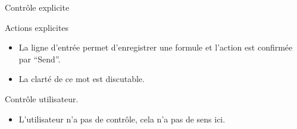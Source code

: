 \begin{frame}{Contrôle explicite}

  \begin{block}{Actions explicites}
    \begin{itemize}
    \item La ligne d'entrée permet d'enregistrer une formule et
      l'action est confirmée par ``Send''.
    \item La clarté de ce mot est discutable.
    \end{itemize}
  \end{block}

  \begin{block}{Contrôle utilisateur.}
    \begin{itemize}
    \item L'utilisateur n'a pas de contrôle, cela n'a pas de sens ici.
    \end{itemize}
  \end{block}

\end{frame}
